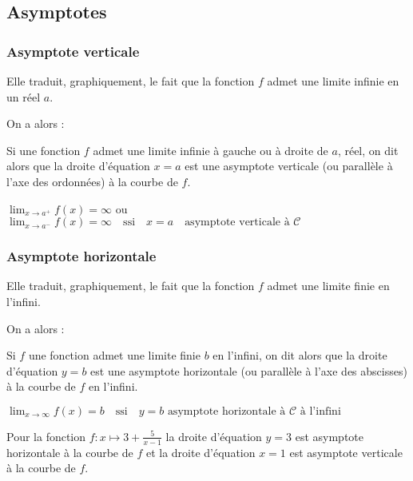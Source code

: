 \subsection{Asymptotes}
\subsubsection{Asymptote verticale}
Elle traduit, graphiquement, le fait que la fonction $f$ admet une limite infinie en un réel $a$.

On a alors :

\begin{definition}
Si  une fonction $f$ admet une limite infinie à gauche ou à droite de $a$, réel, on dit alors que la droite d'équation $x=a$ est une asymptote verticale (ou parallèle à l'axe des ordonnées)  à la courbe de $f$.

$\displaystyle\lim_{x \to a^{+}}f(x)=\infty$  ou 
$\displaystyle\lim_{x \to a^{-}}f(x)=\infty\quad \text{ssi}\quad x=a \quad\text{asymptote verticale à }\mathcal{C} $
\end{definition}



\subsubsection{Asymptote horizontale}
Elle traduit, graphiquement, le fait que la fonction $f$ admet une limite finie en l'infini.

On a alors :

\begin{definition}
Si $f$ une fonction admet une limite finie $b$ en l'infini, on dit alors que la droite d'équation $y=b$ est une asymptote horizontale (ou parallèle à l'axe des abscisses) à la courbe de $f$ en l'infini.

$\displaystyle \lim_{x \to \infty}f(x)=b \quad\text{ssi}\quad y=b \text{ asymptote horizontale à }\mathcal{C} \text{ à l'infini}$
\end{definition}

\begin{example}
Pour la fonction $f : x\mapsto 3+ \frac{5}{x-1} $ 
la droite d'équation   $y = 3 $ est asymptote horizontale à la courbe de $f$
et la droite d'équation $x = 1$ est asymptote verticale à la courbe de $f.$

\end{example}

